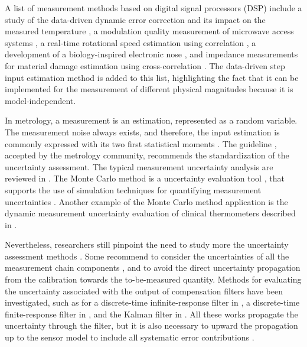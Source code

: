 A list of measurement methods based on digital signal processors (DSP) include 
a study of the data-driven dynamic error correction and its impact on the measured temperature \citep{Saggin01},
a modulation quality measurement of microwave access systems \citep{Angrisani10}, 
a real-time rotational speed estimation using correlation \citep{Wang14},
a development of a biology-inspired electronic nose \citep{Jing16},
and impedance measurements for material damage estimation using cross-correlation \citep{deCastro19}.
The data-driven step input estimation method \citep{Markovsky15cep} is added to this list, highlighting the fact that it can be implemented for the measurement of different physical magnitudes because it is model-independent.


In metrology, a measurement is an estimation, represented as a random variable.
The measurement noise always exists, and therefore, the input estimation is commonly expressed with its two first statistical moments \citep{Ferrero06}.
The guideline \citep{GUM08}, accepted by the metrology community, recommends the standardization of the uncertainty assessment.
The typical measurement uncertainty analysis are reviewed in \citep{daSilva12}.
The Monte Carlo method is a uncertainty evaluation tool \citep{Cox06},
that supports the use of simulation techniques for quantifying measurement uncertainties \citep{Esward16}.
Another example of the Monte Carlo method application is the dynamic measurement uncertainty evaluation of clinical thermometers described in \citep{Ogorevc16}.

Nevertheless, researchers still pinpoint the need to study more the uncertainty assessment methods \citep{Esward09, Hessling10}.
Some recommend to consider the uncertainties of all the measurement chain components \citep{Diniz17}, and to avoid the direct uncertainty propagation from the calibration towards the to-be-measured quantity.  
Methods for evaluating the uncertainty associated with the output of compensation filters have been investigated, such as for
a discrete-time infinite-response filter in \citep{Link09},
a discrete-time finite-response filter in \citep{Elster07, Elster08}, and
the Kalman filter in \citep{Eichstadt16b}.
All these works propagate the uncertainty through the filter, but it is also necessary to upward the propagation up to the sensor model to include all systematic error contributions \citep{Hessling11}.



